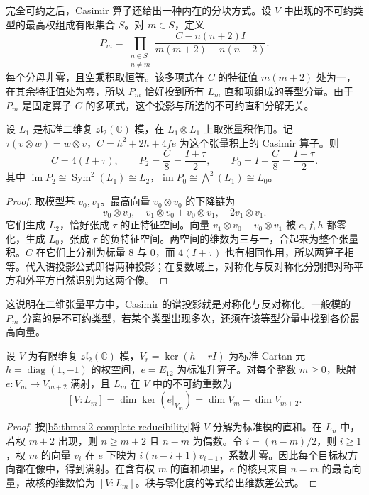 完全可约之后，Casimir 算子还给出一种内在的分块方式。设 \(V\) 中出现的不可约类型的最高权组成有限集合 \(S\)。对 \(m\in S\)，定义
\[
	P_m=\prod_{\substack{n\in S\\n\ne m}} \frac{C-n(n+2)I}{m(m+2)-n(n+2)}.
\]
每个分母非零，且空乘积取恒等。该多项式在 \(C\) 的特征值 \(m(m+2)\) 处为一，在其余特征值处为零，所以 \(P_m\) 恰好投到所有 \(L_m\) 直和项组成的等型分量。由于 \(P_m\) 是固定算子 \(C\) 的多项式，这个投影与所选的不可约直和分解无关。
\begin{proposition}\label{b5:prop:sl2-tensor-square-projections}
	设 \(L_1\) 是标准二维复 \(\mathfrak{sl}_2(\mathbb C)\) 模，在 \(L_1\otimes L_1\) 上取张量积作用。记 \(\tau(v\otimes w)=w\otimes v\)，\(C=h^2+2h+4fe\) 为这个张量积上的 Casimir 算子。则
	\[
		C=4(I+\tau),\qquad P_2=\frac C8=\frac{I+\tau}{2},\qquad P_0=I-\frac C8=\frac{I-\tau}{2}.
	\]
	其中 \(\operatorname{im}P_2\cong\operatorname{Sym}^2(L_1)\cong L_2\)，\(\operatorname{im}P_0\cong\bigwedge^2(L_1)\cong L_0\)。
\end{proposition}
\begin{proof}
	取模型基 \(v_0,v_1\)。最高向量 \(v_0\otimes v_0\) 的下降链为
	\[
		v_0\otimes v_0,\quad v_1\otimes v_0+v_0\otimes v_1,\quad 2v_1\otimes v_1.
	\]
	它们生成 \(L_2\)，恰好张成 \(\tau\) 的正特征空间。向量 \(v_1\otimes v_0-v_0\otimes v_1\) 被 \(e,f,h\) 都零化，生成 \(L_0\)，张成 \(\tau\) 的负特征空间。两空间的维数为三与一，合起来为整个张量积。\(C\) 在它们上分别为标量 \(8\) 与 \(0\)，而 \(4(I+\tau)\) 也有相同作用，所以两算子相等。代入谱投影公式即得两种投影；在复数域上，对称化与反对称化分别把对称平方和外平方自然识别为这两个像。
\end{proof}
这说明在二维张量平方中，Casimir 的谱投影就是对称化与反对称化。一般模的 \(P_m\) 分离的是不可约类型，若某个类型出现多次，还须在该等型分量中找到各份最高向量。
\begin{proposition}\label{b5:prop:sl2-highest-multiplicity}
	设 \(V\) 为有限维复 \(\mathfrak{sl}_2(\mathbb C)\) 模，\(V_r=\ker(h-rI)\) 为标准 Cartan 元 \(h=\operatorname{diag}(1,-1)\) 的权空间，\(e=E_{12}\) 为标准升算子。对每个整数 \(m\ge0\)，映射 \(e:V_m\to V_{m+2}\) 满射，且 \(L_m\) 在 \(V\) 中的不可约重数为
	\[
		[V:L_m]=\dim\ker(e|_{V_m}) =\dim V_m-\dim V_{m+2}.
	\]
\end{proposition}
\begin{proof}
	按\cref{b5:thm:sl2-complete-reducibility}将 \(V\) 分解为标准模的直和。在 \(L_n\) 中，若权 \(m+2\) 出现，则 \(n\ge m+2\) 且 \(n-m\) 为偶数。令 \(i=(n-m)/2\)，则 \(i\ge1\)，权 \(m\) 的向量 \(v_i\) 在 \(e\) 下映为 \(i(n-i+1)v_{i-1}\)，系数非零。因此每个目标权方向都在像中，得到满射。在含有权 \(m\) 的直和项里，\(e\) 的核只来自 \(n=m\) 的最高向量，故核的维数恰为 \([V:L_m]\)。秩与零化度的等式给出维数差公式。
\end{proof}
